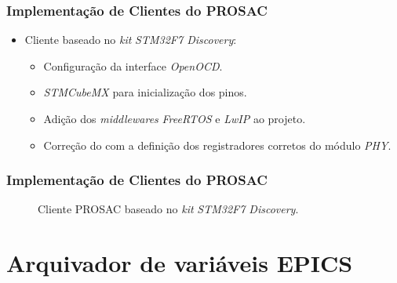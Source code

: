\documentclass{beamer}
\begin{document}
\begin{frame}
\frametitle {Implementação de Clientes do PROSAC}

\begin{itemize}
  \item Cliente baseado no \textit{kit} \textit{STM32F7 Discovery}:	
  
  \begin{itemize} 
  \item Configuração da interface \textit{OpenOCD}.
  \item \textit{STMCubeMX} para inicialização dos pinos.
  \item Adição dos \textit{middlewares} \textit{FreeRTOS} e \textit{LwIP} ao
  projeto.
  \item Correção do  com a definição dos
  registradores corretos do módulo \textit{PHY}.
  \end{itemize}
\end{itemize}

\vspace{-12pt}

\frametitle {Implementação de Clientes do PROSAC}
\begin{figure}[h]
\centering
{}
%
\vspace{-12pt}
\caption {Cliente PROSAC baseado no \textit{kit} \textit{STM32F7 Discovery}.}
\label{fig:stm32}
\end{figure}

\end{frame}

\section {Arquivador de variáveis EPICS}
\end{document}
